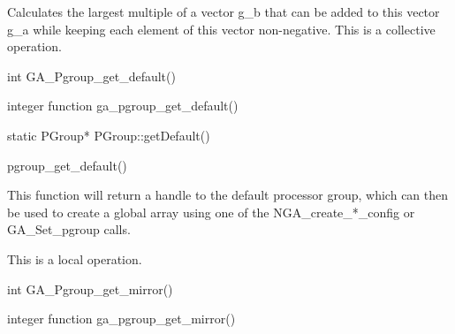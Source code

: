 \documentclass[12pt]{article}
\begin{document}
\begin{desc}

Calculates the largest multiple of a vector g_b that can be added to this vector g_a while keeping each element of this vector non-negative.
This is a collective operation.
\end{desc}


\begin{capi}
\begin{ccode}
int GA_Pgroup_get_default()
\end{ccode}
\end{capi}

\begin{fapi}
\begin{fcode}
integer function ga_pgroup_get_default()
\end{fcode}
\end{fapi}

\begin{cxxapi}
\begin{cxxcode}
static PGroup* PGroup::getDefault()
\end{cxxcode}
\end{cxxapi}

\begin{pyapi}
\begin{pycode}
pgroup_get_default() 
\end{pycode}
\end{pyapi} 


\begin{desc}

This function will return a handle to the default processor group, which can then be used to create a global array using one of the NGA_create_*_config or GA_Set_pgroup calls.

This is a local operation. 
\end{desc}


\begin{capi}
\begin{ccode}
int GA_Pgroup_get_mirror()
\end{ccode}
\end{capi}

\begin{fapi}
\begin{fcode}
integer function ga_pgroup_get_mirror()
\end{fcode}
\end{fapi}
\end{document}
